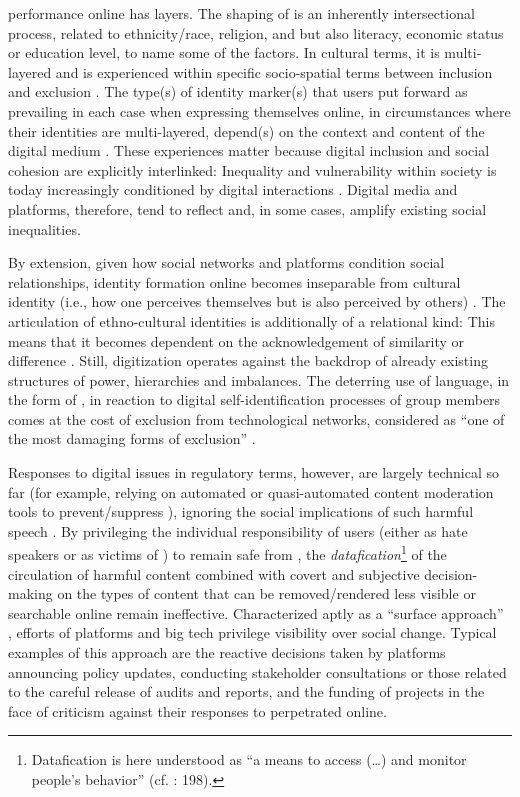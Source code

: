 \documentclass[output=paper,colorlinks,citecolor=brown]{langscibook}
\begin{document}
 performance online has layers. The shaping of  is an inherently intersectional process, related to ethnicity/race, religion, and  but also literacy, economic status or education level, to name some of the factors. In cultural terms, it is multi-layered and is experienced within specific socio-spatial terms between inclusion and exclusion \citep{yuval-davis2006}. The type(s) of identity marker(s) that users put forward as prevailing in each case when expressing themselves online, in circumstances where their identities are multi-layered, depend(s) on the context and content of the digital medium \citep[624]{pennington2018}. These experiences matter because digital inclusion and social cohesion are explicitly interlinked: Inequality and vulnerability within society is today increasingly conditioned by digital interactions \citep{marlowe_bartley_collins2017}. Digital media and platforms, therefore, tend to reflect and, in some cases, amplify existing social inequalities. 

By extension, given how social networks and platforms condition social relationships, identity formation online becomes inseparable from cultural identity (i.e., how one perceives themselves but is also perceived by others) \citep[6]{cover2023}. The articulation of ethno-cultural identities is additionally of a relational kind: This means that it becomes dependent on the acknowledgement of similarity or difference \citep[6]{cover2023}. Still, digitization operates against the backdrop of already existing structures of power, hierarchies and imbalances. The deterring use of language, in the form of , in reaction to digital self-identification processes of  group members comes at the cost of exclusion from technological networks, considered as ``one of the most damaging forms of exclusion'' \citep[3]{castells2001}. 

Responses to digital  issues in regulatory terms, however, are largely technical so far (for example, relying on automated or quasi-automated content moderation tools to prevent/suppress ), ignoring the social implications of such harmful speech \citep{gillett_stardust_burgess2022,topidi2024_attacking}. By privileging the individual responsibility of users (either as hate speakers or as victims of ) to remain safe from , the \textit{datafication}\footnote{%
Datafication is here understood as ``a means to access (…) and monitor people's behavior'' (cf. \citealt{van_dijk2014}: 198).} 
of the circulation of harmful content combined with covert and subjective decision-making on the types of content that can be removed/rendered less visible or searchable online remain ineffective.  Characterized aptly as a ``surface approach'' \citep[8]{gillett_stardust_burgess2022}, efforts of platforms and big tech privilege visibility over social change. Typical examples of this approach are the reactive decisions taken by platforms announcing policy updates, conducting stakeholder consultations or those related to the careful release of audits and reports, and the funding of projects in the face of criticism against their responses to  perpetrated online. 
\end{document}
